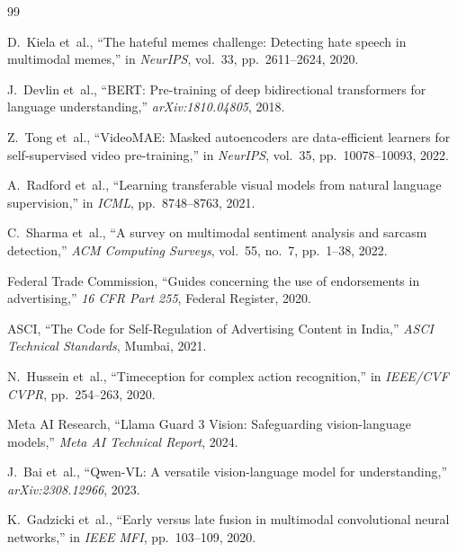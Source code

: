 \documentclass[12pt,a4paper]{report}
\begin{document}

\begin{thebibliography}{99}

D.~Kiela et~al.,
\newblock ``The hateful memes challenge: Detecting hate speech in multimodal memes,''
\newblock in \emph{NeurIPS}, vol.~33, pp.~2611--2624, 2020.

J.~Devlin et~al.,
\newblock ``BERT: Pre-training of deep bidirectional transformers for language understanding,''
\newblock \emph{arXiv:1810.04805}, 2018.

Z.~Tong et~al.,
\newblock ``VideoMAE: Masked autoencoders are data-efficient learners for self-supervised video pre-training,''
\newblock in \emph{NeurIPS}, vol.~35, pp.~10078--10093, 2022.

A.~Radford et~al.,
\newblock ``Learning transferable visual models from natural language supervision,''
\newblock in \emph{ICML}, pp.~8748--8763, 2021.

C.~Sharma et~al.,
\newblock ``A survey on multimodal sentiment analysis and sarcasm detection,''
\newblock \emph{ACM Computing Surveys}, vol.~55, no.~7, pp.~1--38, 2022.

Federal Trade Commission,
\newblock ``Guides concerning the use of endorsements in advertising,''
\newblock \emph{16 CFR Part 255}, Federal Register, 2020.

ASCI,
\newblock ``The Code for Self-Regulation of Advertising Content in India,''
\newblock \emph{ASCI Technical Standards}, Mumbai, 2021.

N.~Hussein et~al.,
\newblock ``Timeception for complex action recognition,''
\newblock in \emph{IEEE/CVF CVPR}, pp.~254--263, 2020.

Meta AI Research,
\newblock ``Llama Guard 3 Vision: Safeguarding vision-language models,''
\newblock \emph{Meta AI Technical Report}, 2024.

J.~Bai et~al.,
\newblock ``Qwen-VL: A versatile vision-language model for understanding,''
\newblock \emph{arXiv:2308.12966}, 2023.

K.~Gadzicki et~al.,
\newblock ``Early versus late fusion in multimodal convolutional neural networks,''
\newblock in \emph{IEEE MFI}, pp.~103--109, 2020.


\end{thebibliography}
\end{document}
